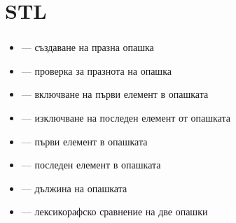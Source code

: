 \documentclass[alsotrans]{beamerswitch}
\begin{document}
\section{STL}

\begin{frame}
  \frametitle{}

  \begin{itemize}
  \item {} --- създаване на празна опашка
  \item {} --- проверка за празнота на опашка
  \item {} --- включване на първи елемент в опашката
  \item {} --- изключване на последен елемент от опашката
  \item {} --- първи елемент в опашката
  \item {} --- последен елемент в опашката
  \item {} --- дължина на опашката
  \item \lst{==,!=,<,>,<=,>=} --- лексикорафско сравнение на две опашки
  \end{itemize}
\end{frame}
\end{document}
